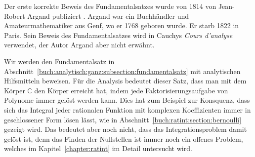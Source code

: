 Der erste korrekte Beweis des Fundamentalsatzes wurde von 1814 von
Jean-Robert Argand publiziert \cite{buch:argand}.
%
Argand war ein Buchhändler und Amateurmathematiker aus Genf,
wo er 1768 geboren wurde.
Er starb 1822 in Paris.
Sein Beweis des Fundamentalsatzes wird in Cauchys \emph{Cours d'analyse}
%
\cite{buch:cauchy} verwendet, der Autor Argand aber nicht erwähnt.

Wir werden den Fundamentalsatz in
Abschnitt~\ref{buch:analytisch:ganz:subsection:fundamentalsatz}
mit analytischen Hilfsmitteln beweisen.
Für die Analysis bedeutet dieser Satz, dass man mit dem Körper
$\mathbb{C}$ den Körper erreicht hat, indem jede Faktorisierungsaufgabe
von Polynome immer gelöst werden kann.
Dies hat zum Beispiel zur Konsquenz, dass sich das Integral
%
jeder rationalen Funktion mit komplexen Koeffizienten immer
in geschlossener Form lösen lässt, wie
in Abschnitt~\ref{buch:ratint:section:bernoulli} gezeigt wird.
Das bedeutet aber noch nicht, dass das Integrationsproblem damit
gelöst ist, denn das Finden der Nullstellen ist immer noch ein
offenes Problem, welches im Kapitel~\ref{chapter:ratint} im Detail
untersucht wird.

